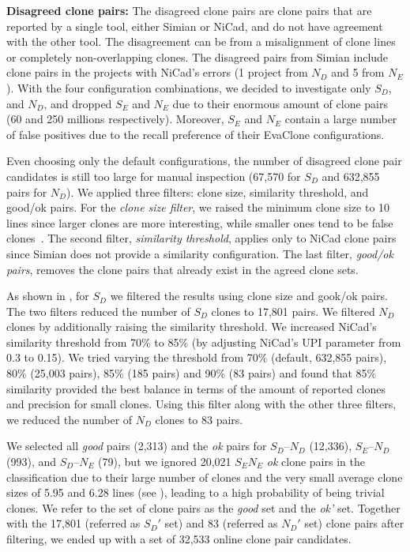 \documentclass[sigconf,review, anonymous]{acmart}
\begin{document}
\textbf{Disagreed clone pairs: }
The disagreed clone pairs are clone pairs that are reported by a
single tool, either Simian or NiCad, and do not have agreement with
the other tool. The disagreement can be from a misalignment of clone
lines or completely non-overlapping clones. The disagreed pairs from
Simian include clone pairs in the projects with NiCad's errors (1
project from $N_D$ and 5 from $N_E$).  With the four configuration
combinations, we decided to investigate only $S_D$, and $N_D$, and
dropped $S_E$ and $N_E$ due to their enormous amount of clone pairs
(60 and 250 millions respectively). Moreover, $S_E$ and $N_E$ contain
a large number of false positives due to the recall preference of
their EvaClone configurations.

Even choosing only the default configurations, the number of disagreed
clone pair candidates is still too large for manual inspection (67,570
for $S_D$ and 632,855 pairs for $N_D$). We applied three filters: clone
size, similarity threshold, and good/ok pairs. For
the \emph{clone size filter}, we raised the minimum clone size to 10 lines
since larger clones are more interesting, while smaller ones tend to
be false clones~\cite{Saini2016}.
The second filter, \emph{similarity threshold}, applies
only to NiCad clone pairs since Simian does not provide a similarity
configuration. The last filter, \emph{good/ok pairs}, removes the
clone pairs that already exist in the agreed clone sets.

As shown in , for $S_D$ we filtered the
results using clone size and gook/ok pairs. The
two filters reduced the number of $S_D$ clones to 17,801 pairs. We
filtered $N_D$ clones by additionally raising the similarity
threshold. We increased NiCad's similarity threshold from 70\% to 85\%
(by adjusting NiCad's $\mathrm{UPI}$ parameter from 0.3 to 0.15). We
tried varying the threshold from 70\% (default, 632,855 pairs), 80\%
(25,003 pairs), 85\% (185 pairs) and 90\% (83 pairs) and found that
85\% similarity provided the best balance in terms of the amount of
reported clones and precision for small clones. Using this filter
along with the other three filters, we reduced the number of $N_D$
clones to 83 pairs.

We selected all \textit{good} pairs (2,313) and the \textit{ok} pairs for
$S_D$--$N_D$ (12,336), $S_E$--$N_D$ (993), and $S_D$--$N_E$ (79), but we ignored
20,021 $S_EN_E$ \textit{ok} clone pairs in the classification due to
their large number of clones and the very small average clone sizes of
5.95 and 6.28 lines (see ), leading to a high
probability of being trivial clones. We refer to the set of clone
pairs as the \textit{good} set and the \textit{ok'} set.
Together with the 17,801 (referred as $S_D'$ set) and 83 (referred as
$N_D'$ set) clone pairs after filtering, we ended up with a set of 32,533 online clone pair candidates.
\end{document}
